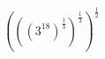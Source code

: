 \documentclass[preview]{standalone}
\begin{document}
\begin{align*}
\left(\left(\left(3^{18} \right)^\frac{1}{3} \right)^\frac{1}{3} \right)^\frac{1}{2}
\end{align*}
\end{document}
